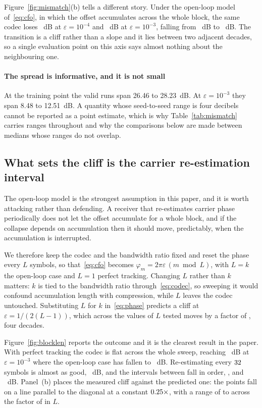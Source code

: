 \documentclass[preprint,11pt,3p]{elsarticle}
\begin{document}
Figure~\ref{fig:mismatch}(b) tells a different story. Under the open-loop model
of~\eqref{eq:cfo}, in which the offset accumulates across the whole block, the same codec loses
\numDropCfoEa~dB at $\varepsilon = 10^{-4}$ and \numDropCfoEb~dB at $\varepsilon = 10^{-3}$,
falling from \numPsnrCfoClean~dB to \numPsnrCfoEb~dB. The transition is a cliff rather than a
slope and it lies between two adjacent decades, so a single evaluation point on this axis says
almost nothing about the neighbouring one.

\paragraph{The spread is informative, and it is not small}
At the training point the valid runs span 26.46 to 28.23~dB. At $\varepsilon = 10^{-3}$ they span
8.48 to 12.51~dB. A quantity whose seed-to-seed range is four decibels cannot be reported as a
point estimate, which is why Table~\ref{tab:mismatch} carries ranges throughout and why the
comparisons below are made between medians whose ranges do not overlap.

\subsection{What sets the cliff is the carrier re-estimation interval}
\label{sec:blocklen}

The open-loop model is the strongest assumption in this paper, and it is worth attacking rather
than defending. A receiver that re-estimates carrier phase periodically does not let the offset
accumulate for a whole block, and if the collapse depends on accumulation then it should move,
predictably, when the accumulation is interrupted.

We therefore keep the codec and the bandwidth ratio fixed and reset the phase every $L$ symbols,
so that~\eqref{eq:cfo} becomes $\varphi_m = 2\pi\varepsilon\,(m \bmod L)$, with $L = k$ the
open-loop case and $L = 1$ perfect tracking. Changing $L$ rather than $k$ matters: $k$ is tied to
the bandwidth ratio through~\eqref{eq:codec}, so sweeping it would confound accumulation length
with compression, while $L$ leaves the codec untouched. Substituting $L$ for $k$
in~\eqref{eq:phase} predicts a cliff at $\varepsilon = 1/(2(L-1))$, which across the
\numLpts{} values of $L$ tested moves by a factor of \numLspan{}, four decades.

Figure~\ref{fig:blocklen} reports the outcome and it is the clearest result in the paper. With
perfect tracking the codec is flat across the whole sweep, reaching \numPsnrLlOne~dB at
$\varepsilon = 10^{-3}$ where the open-loop case has fallen to \numPsnrLlFth~dB. Re-estimating
every $32$ symbols is almost as good, \numPsnrLlTt~dB, and the intervals between fall in
order, \numPsnrLlTwo{}, \numPsnrLlEight{} and \numPsnrLlOtt~dB. Panel~(b) places the measured
cliff against the predicted one: the \numLpts{} points fall on a line parallel to the diagonal at
a constant $0.25\times$, with a range of \numCliffRatioLo{} to \numCliffRatioHi{}
across the factor of \numLspan{} in $L$.
\end{document}
